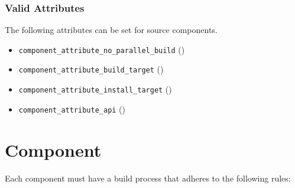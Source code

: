 \subsubsection{Valid Attributes}

The following attributes can be set for source components.

\begin{itemize}
\item{\texttt{component\_attribute\_no\_parallel\_build}}
  ()
\item{\texttt{component\_attribute\_build\_target}}  ()
\item{\texttt{component\_attribute\_install\_target}} ()
\item{\texttt{component\_attribute\_api}} ()
\end{itemize}

\section{Component \makefile}\label{wrap:component-makefile}

Each component must have a build process that adheres to the following
rules:


